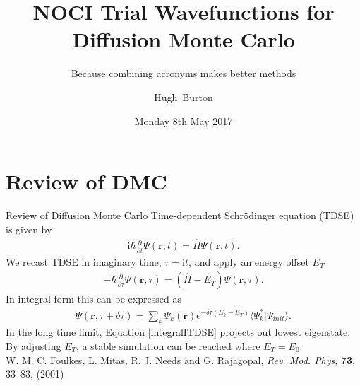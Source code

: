 \documentclass{beamer}
\title[MainTitle]
{%
  NOCI Trial Wavefunctions for Diffusion Monte Carlo
}
\subtitle{Because combining acronyms makes better methods}
\author
{
  \hskip-1.7mm
  Hugh~Burton %
}
\institute[Burton and others]
{
  University of Cambridge
}
\date{Monday 8th May 2017}
\newcommand{\II}{\mathrm{i}}
\begin{document}
\begin{frame}
  \titlepage
\end{frame}


\section{Review of DMC}

\begin{frame}{Review of Diffusion Monte Carlo}
  Time-dependent Schr\"{o}dinger equation (TDSE) is given by
  \small{\begin{align}
    \label{TDSE}
    \II \hbar \frac{\partial}{\partial t} \Psi (\mathbf{r}, t) = \hat{H} \Psi (\mathbf{r}, t).
  \end{align}}%
  We recast TDSE in imaginary time, $\tau = \II t$, and apply an energy offset $E_T$
  \small{\begin{align}
  \label{ITDSE}
    - \hbar \frac{\partial}{\partial \tau} \Psi (\mathbf{r}, \tau) = (\hat{H} - E_T) \Psi (\mathbf{r}, \tau).
  \end{align}}%
  In integral form this can be expressed as
  \small{\begin{align}
    \label{integralITDSE}
    \Psi(\mathbf{r},\tau+\delta \tau) =  \sum_k \Psi_k(\mathbf{r}) \mathrm{e}^{-\delta \tau(E_k - E_T)} \langle \Psi_k^* | \Psi_{init} \rangle.
  \end{align}}%
 In the long time limit, Equation \ref{integralITDSE} projects out lowest eigenstate.
 By adjusting $E_T$, a stable simulation can be reached where $E_T = E_0$. \\
 \vspace{1em}
 \tiny{W. M. C. Foulkes, L. Mitas, R. J. Needs and G. Rajagopal, \textit{Rev. Mod. Phys}, \textbf{73}, 33--83, (2001)
 }%
\end{frame}
\end{document}

